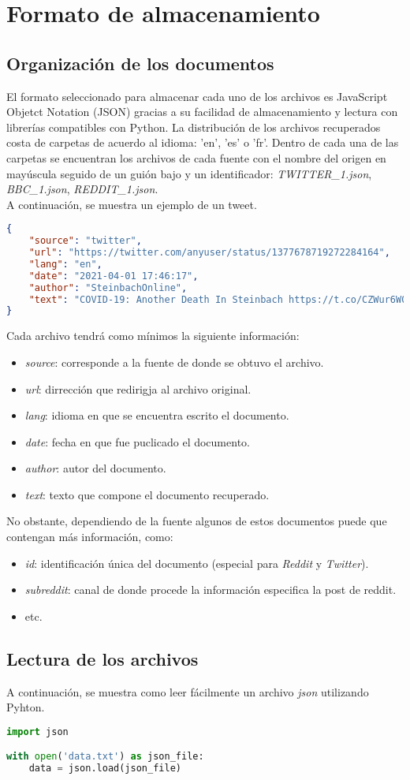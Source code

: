 \section{Formato de almacenamiento}

\subsection{Organización de los documentos}
El formato seleccionado para almacenar cada uno de los archivos es JavaScript Objetct Notation (JSON) gracias a su facilidad de almacenamiento y lectura con librerías compatibles con Python. La distribución de los archivos recuperados costa de carpetas de acuerdo al idioma: 'en', 'es' o 'fr'. Dentro de cada una de las carpetas se encuentran los archivos de cada fuente con el nombre del origen en mayúscula seguido de un guión bajo y un identificador: \textit{TWITTER\_1.json}, \textit{BBC\_1.json}, \textit{REDDIT\_1.json}.\\

A continuación, se muestra un ejemplo de un tweet.

\begin{lstlisting}[language=json,firstnumber=1]
{
    "source": "twitter",
    "url": "https://twitter.com/anyuser/status/1377678719272284164",
    "lang": "en",
    "date": "2021-04-01 17:46:17",
    "author": "SteinbachOnline",
    "text": "COVID-19: Another Death In Steinbach https://t.co/CZWur6W0Mo"
}
\end{lstlisting}

Cada archivo tendrá como mínimos la siguiente información:
\begin{itemize}
    \item \textit{source}: corresponde a la fuente de donde se obtuvo el archivo.
    \item \textit{url}: dirrección que redirigja al archivo original.
    \item \textit{lang}: idioma en que se encuentra escrito el documento.
    \item \textit{date}: fecha en que fue puclicado el documento.
    \item \textit{author}: autor del documento.
    \item \textit{text}: texto que compone el documento recuperado.
\end{itemize}

No obstante, dependiendo de la fuente algunos de estos documentos puede que contengan más información, como:
\begin{itemize}
    \item \textit{id}: identificación única del documento (especial para \textit{Reddit} y \textit{Twitter}).
    \item \textit{subreddit}: canal de donde procede la información especifica la post de reddit.
    \item etc.
\end{itemize}

\subsection{Lectura de los archivos}
A continuación, se muestra como leer fácilmente un archivo \textit{json} utilizando Pyhton.

\begin{lstlisting}[language=Python,firstnumber=1]
import json

with open('data.txt') as json_file:
    data = json.load(json_file)
\end{lstlisting}